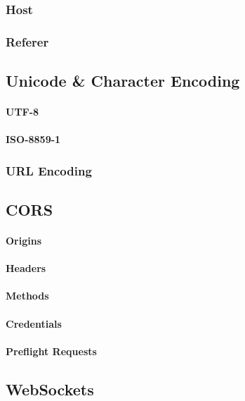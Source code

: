 \documentclass[a4paper]{article}
\begin{document}
        \subsubsection{Host}
        \subsubsection{Referer}

    \subsection{Unicode \& Character Encoding}
        \paragraph{UTF-8}
        \paragraph{ISO-8859-1}
        \subsubsection{URL Encoding}
        
    \subsection{CORS}
        \paragraph{Origins}
        \paragraph{Headers}
        \paragraph{Methods}
        \paragraph{Credentials}
        \paragraph{Preflight Requests}
        
    \subsection{WebSockets}
\end{document}
